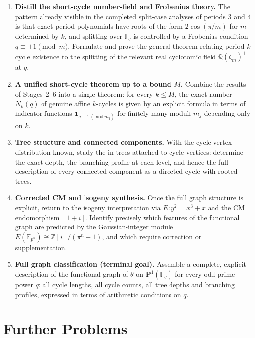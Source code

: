 \documentclass[11pt]{article}
\newcommand{\F}{\mathbb{F}}
\newcommand{\Pone}{\mathbf{P}^1}
\begin{document}
\begin{enumerate}[label=\textbf{Stage \arabic*.}, leftmargin=*, align=left]
\item \textbf{Distill the short-cycle number-field and Frobenius theory.}
The pattern already visible in the completed split-case analyses of periods $3$ and $4$ is that exact-period polynomials have roots of the form $2\cos(\pi/m)$ for $m$ determined by $k$, and splitting over $\F_q$ is controlled by a Frobenius condition $q\equiv \pm 1\pmod{m}$.
Formulate and prove the general theorem relating period-$k$ cycle existence to the splitting of the relevant real cyclotomic field $\mathbb{Q}(\zeta_m)^+$ at $q$.

\item \textbf{A unified short-cycle theorem up to a bound $M$.}
Combine the results of Stages~2--6 into a single theorem:
for every $k\leq M$, the exact number $N_k(q)$ of genuine affine $k$-cycles is given by an explicit formula in terms of indicator functions $\mathbf{1}_{q\equiv 1\,(\mathrm{mod}\,m_j)}$ for finitely many moduli $m_j$ depending only on $k$.

\item \textbf{Tree structure and connected components.}
With the cycle-vertex distribution known, study the in-trees attached to cycle vertices: determine the exact depth, the branching profile at each level, and hence the full description of every connected component as a directed cycle with rooted trees.

\item \textbf{Corrected CM and isogeny synthesis.}
Once the full graph structure is explicit, return to the isogeny interpretation via $E:y^2=x^3+x$ and the CM endomorphism $[1+i]$.
Identify precisely which features of the functional graph are predicted by the Gaussian-integer module $E(\F_{p^n})\cong\mathbb{Z}[i]/(\pi^n-1)$, and which require correction or supplementation.

\item \textbf{Full graph classification (terminal goal).}
Assemble a complete, explicit description of the functional graph of $\theta$ on $\Pone(\F_q)$ for every odd prime power $q$: all cycle lengths, all cycle counts, all tree depths and branching profiles, expressed in terms of arithmetic conditions on $q$.

\end{enumerate}

\section{Further Problems}
\end{document}
